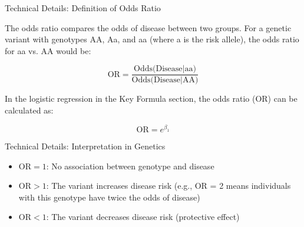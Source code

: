 \begin{frame}{Technical Details: Definition of Odds Ratio}

The odds ratio compares the odds of disease between two groups. For a genetic variant with genotypes AA, Aa, and aa (where a is the risk allele), the odds ratio for aa vs. AA would be:

$$
\text{OR} = \frac{\text{Odds(Disease|aa)}}{\text{Odds(Disease|AA)}}
$$

In the logistic regression in the Key Formula section, the odds ratio (OR) can be calculated as:

$$
\text{OR} = e^{\beta_1}
$$

\end{frame}

\begin{frame}{Technical Details: Interpretation in Genetics}

\begin{itemize}
\item $\text{OR} = 1$: No association between genotype and disease
\item $\text{OR} > 1$: The variant increases disease risk (e.g., OR = 2 means individuals with this genotype have twice the odds of disease)
\item $\text{OR} < 1$: The variant decreases disease risk (protective effect)
\end{itemize}

\end{frame}

